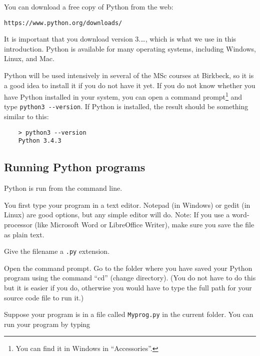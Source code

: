  
You can download a free copy of Python 
from the web:

\begin{verbatim}
https://www.python.org/downloads/
\end{verbatim}

It is important that you download version 3.\ldots, which is what we
use in this introduction.
Python is available for many
operating systems, including Windows, Linux, and Mac.%


Python will be used intensively in several of the MSc courses 
at Birkbeck, so it is a good idea to install it if you do not have it
yet.
If you do not know whether you have Python installed in your
system, you can open a command prompt\footnote{You can find it in Windows in
  ``Accessories''.} and type
\verb+python3 --version+.
If Python is installed, the result should be something similar to this:

\begin{verbatim}
    > python3 --version
    Python 3.4.3
\end{verbatim}



\subsection*{Running Python programs}

Python is run from the command line.

You first type your program in a text editor. Notepad (in Windows) or
gedit (in Linux) are good options, but any simple editor will
do. Note: If you use a word-processor (like Microsoft Word or
LibreOffice Writer), make sure you save the file as plain text.

Give the filename a \texttt{.py} extension.

Open the command prompt. 
Go to the folder where you have saved your Python
program using the command ``cd'' (change directory). (You do not have to
do this but it is easier if you do, otherwise you would have to type the full
path for your source code file to run it.)

Suppose your program is in a file called
\texttt{Myprog.py} in the current folder.
You can run your program by typing

